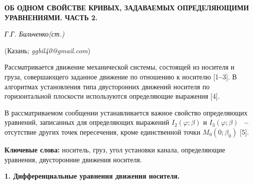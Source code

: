 
\begin{center}
    {\bf  ОБ  ОДНОМ  СВОЙСТВЕ  КРИВЫХ,
ЗАДАВАЕМЫХ  ОПРЕДЕЛЯЮЩИМИ  УРАВНЕНИЯМИ.
ЧАСТЬ  2.}

    {\it  Г.Г.  Бильченко(ст.)}

    (Казань;  {\it  ggbil40@gmail.com})
\end{center}




    Рассматривается  движение
механической  системы,
состоящей  из  носителя  и  груза,
совершающего  заданное  движение
по  отношению  к  носителю
[1{\textbf{--}}3].
В  алгоритмах  установления  типа
двусторонних  движений  носителя
по  горизонтальной  плоскости
используются  определяющие  выражения
[4].



    В  рассматриваемом  сообщении
устанавливается  важное  свойство
определяющих  уравнений,
записанных  для  определяющих  выражений
$I_{2}\left(\varphi; \beta\right)$
и
$I_{3}\left(\varphi; \beta\right)$%
~{\textbf{--}}
отсутствие  других  точек  пересечения,
кроме  единственной  точки
$\displaystyle
M_{0}\left(
  0; \beta_{0}
  \right)$
[5].



    \textbf{Ключевые  слова:}
носитель,
груз,
угол  установки  канала,
определяющие  уравнения,
двусторонние  движения  носителя.




\textbf{1.  Дифференциальные  уравнения
движения  носителя.}\nopagebreak


